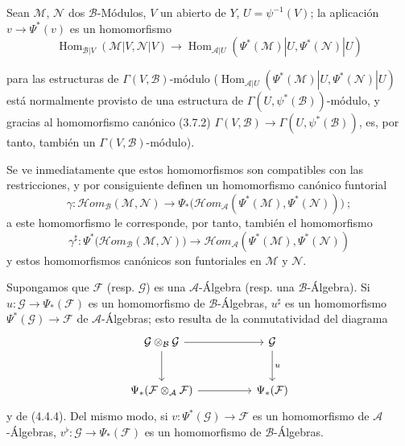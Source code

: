 \begin{env}[4.4.6]
\label{0.4.4.6-fr}
Sean $\mathcal{M}$, $\mathcal{N}$ dos $\mathcal{B}$-Módulos, $V$ un abierto
de $Y$, $U=\psi^{-1}(V)$; la aplicación $v\to\Psi^*(v)$ es un
homomorfismo
\[
  \operatorname{Hom}_{\mathcal{B}|V}(\mathcal{M}|V,\mathcal{N}|V)
  \longrightarrow
  \operatorname{Hom}_{\mathcal{A}|U}
  (\Psi^*(\mathcal{M})|U,\Psi^*(\mathcal{N})|U)
\]
\begin{sloppypar}
para las estructuras de $\Gamma(V,\mathcal{B})$-módulo
($\operatorname{Hom}_{\mathcal{A}|U}
(\Psi^*(\mathcal{M})|U,\allowbreak\Psi^*(\mathcal{N})|U)$ está normalmente provisto de una
estructura de $\Gamma(U,\psi^*(\mathcal{B}))$-módulo, y gracias al
homomorfismo
canónico (3.7.2)
$\Gamma(V,\mathcal{B})\to\Gamma(U,\psi^*(\mathcal{B}))$, es, por tanto, también un
$\Gamma(V,\mathcal{B})$-módulo).
\end{sloppypar}
Se ve inmediatamente que estos homomorfismos son
compatibles con las restricciones, y por consiguiente definen un homomorfismo
canónico funtorial
\[
  \gamma:\mathcal{H}\!om_{\mathcal{B}}(\mathcal{M},\mathcal{N})
  \longrightarrow
  \Psi_*\bigl(\mathcal{H}\!om_{\mathcal{A}}
  (\Psi^*(\mathcal{M}),\Psi^*(\mathcal{N}))\bigr)~;
\]
a este homomorfismo le corresponde, por tanto, también el homomorfismo
\[
  \gamma^\sharp:
  \Psi^*\bigl(\mathcal{H}\!om_{\mathcal{B}}(\mathcal{M},\mathcal{N})\bigr)
  \longrightarrow
  \mathcal{H}\!om_{\mathcal{A}}
  (\Psi^*(\mathcal{M}),\Psi^*(\mathcal{N}))
\]
y estos homomorfismos canónicos son funtoriales en $\mathcal{M}$ y
$\mathcal{N}$.
\end{env}

\begin{env}[4.4.7]
\label{0.4.4.7-fr}
Supongamos que $\mathcal{F}$ (resp. $\mathcal{G}$) es una
$\mathcal{A}$-Álgebra (resp. una $\mathcal{B}$-Álgebra). Si
$u:\mathcal{G}\to\Psi_*(\mathcal{F})$ es un homomorfismo de
$\mathcal{B}$-Álgebras, $u^\sharp$ es un homomorfismo
$\Psi^*(\mathcal{G})\to\mathcal{F}$ de $\mathcal{A}$-Álgebras; esto resulta
de la conmutatividad del diagrama
\[
\begin{tikzcd}[column sep=huge,row sep=large]
\mathcal{G}\otimes_{\mathcal{B}}\mathcal{G}
  \arrow[r] \arrow[d]
  & \mathcal{G} \arrow[d,"u"] \\
\Psi_*(\mathcal{F}\otimes_{\mathcal{A}}\mathcal{F})
  \arrow[r]
  & \Psi_*(\mathcal{F})
\end{tikzcd}
\]
y de (4.4.4). Del mismo modo, si $v:\Psi^*(\mathcal{G})\to\mathcal{F}$ es un
homomorfismo de $\mathcal{A}$-Álgebras,
$v^\flat:\mathcal{G}\to\Psi_*(\mathcal{F})$ es un homomorfismo de
$\mathcal{B}$-Álgebras.
\end{env}

